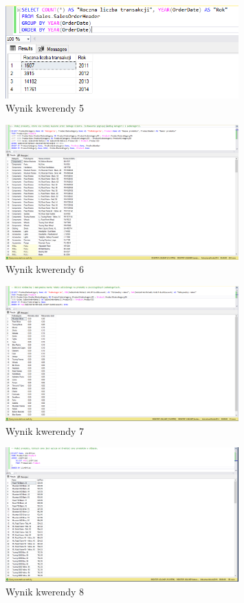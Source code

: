 \documentclass[a4paper,12pt]{article}
\begin{document}
\begin{figure}[H]
    \centering
    \includegraphics[width=0.8\textwidth]{images/05.png}
    \caption{Wynik kwerendy 5}
    \end{figure}

\begin{figure}[H]
    \centering
    \includegraphics[width=0.8\textwidth]{images/06.png}
    \caption{Wynik kwerendy 6}
    \end{figure}

\begin{figure}[H]
    \centering
    \includegraphics[width=0.8\textwidth]{images/07.png}
    \caption{Wynik kwerendy 7}
    \end{figure}

\begin{figure}[H]
    \centering
    \includegraphics[width=0.8\textwidth]{images/08.png}
    \caption{Wynik kwerendy 8}
    \end{figure}
\end{document}
